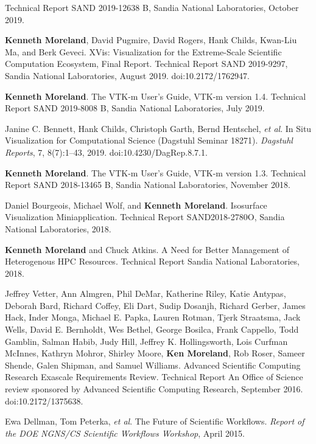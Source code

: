 \begin{enumerate}[label={[\arabic*]}, left=0pt]
Technical Report SAND 2019-12638 B, Sandia National Laboratories, October 2019.
\item  %
  \textbf{Kenneth Moreland}, David Pugmire, David Rogers, Hank Childs, Kwan-Liu Ma, and Berk Geveci.
  {XVis}: Visualization for the Extreme-Scale Scientific Computation Ecosystem, Final Report.
Technical Report SAND 2019-9297, Sandia National Laboratories, August 2019.
  doi:10.2172/1762947.
\item  %
  \textbf{Kenneth Moreland}.
  The {VTK-m} User's Guide, {VTK-m} version 1.4.
Technical Report SAND 2019-8008 B, Sandia National Laboratories, July 2019.
\item  %
  Janine C. Bennett, Hank Childs, Christoph Garth, Bernd Hentschel, \emph{et al}.
  In Situ Visualization for Computational Science (Dagstuhl Seminar 18271).
  \emph{Dagstuhl Reports}, 7, 8(7):1--43, 2019.
  doi:10.4230/DagRep.8.7.1.
\item  %
  \textbf{Kenneth Moreland}.
  The {VTK-m} User's Guide, {VTK-m} version 1.3.
Technical Report SAND 2018-13465 B, Sandia National Laboratories, November 2018.
\item  %
  Daniel Bourgeois, Michael Wolf, and \textbf{Kenneth Moreland}.
  Isosurface Visualization Miniapplication.
Technical Report SAND2018-2780O, Sandia National Laboratories, 2018.
\item  %
  \textbf{Kenneth Moreland} and Chuck Atkins.
  A Need for Better Management of Heterogenous HPC Resources.
Technical Report Sandia National Laboratories, 2018.
\item  %
  Jeffrey Vetter, Ann Almgren, Phil DeMar, Katherine Riley, Katie Antypas, Deborah Bard, Richard Coffey, Eli Dart, Sudip Dosanjh, Richard Gerber, James Hack, Inder Monga, Michael E. Papka, Lauren Rotman, Tjerk Straatsma, Jack Wells, David E. Bernholdt, Wes Bethel, George Bosilca, Frank Cappello, Todd Gamblin, Salman Habib, Judy Hill, Jeffrey K. Hollingsworth, Lois Curfman McInnes, Kathryn Mohror, Shirley Moore, \textbf{Ken Moreland}, Rob Roser, Sameer Shende, Galen Shipman, and Samuel Williams.
  Advanced Scientific Computing Research Exascale Requirements Review.
Technical Report An Office of Science review sponsored by Advanced Scientific Computing Research, September 2016.
  doi:10.2172/1375638.
\item  %
  Ewa Dellman, Tom Peterka, \emph{et al}.
  The Future of Scientific Workflows.
\emph{Report of the DOE NGNS/CS Scientific Workflows Workshop}, April 2015.

\end{enumerate}
